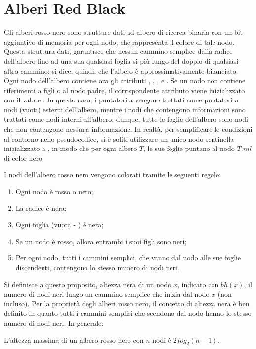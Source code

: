 \section{Alberi Red Black}
Gli alberi rosso nero sono strutture dati ad albero di ricerca binaria con un bit aggiuntivo di memoria per ogni nodo, che rappresenta il colore di tale nodo. Questa struttura dati, garantisce che nessun cammino semplice dalla radice dell'albero fino ad una sua qualsiasi foglia si più lungo del doppio di qualsiasi altro cammino: si dice, quindi, che l'albero è approssimativamente bilanciato. Ogni nodo dell'albero contiene ora gli attributi , , ,  e . Se un nodo non contiene riferimenti a figli o al nodo padre, il corrispondente attributo viene inizializzato con il valore . In questo caso, i puntatori a  vengono trattati come puntatori a nodi (vuoti) esterni dell'albero, mentre i nodi che contengono informazioni sono trattati come nodi interni all'albero: dunque, tutte le foglie dell'albero sono nodi che non contengono nessuna informazione. In realtà, per semplificare le condizioni al contorno nello pseudocodice, si è soliti utilizzare un unico nodo sentinella inizializzato a , in modo che per ogni albero \(T\), le sue foglie puntano al nodo \(T.nil\) di color nero.

I nodi dell'albero rosso nero vengono colorati tramite le seguenti regole:
\begin{enumerate}
  \item Ogni nodo è rosso o nero;
  \item La radice è nera;
  \item Ogni foglia (vuota - ) è nera;
  \item Se un nodo è rosso, allora entrambi i suoi figli sono neri;
  \item Per ogni nodo, tutti i cammini semplici, che vanno dal nodo alle sue foglie discendenti, contengono lo stesso numero di nodi neri.  
\end{enumerate}

Si definisce a questo proposito, altezza nera di un nodo \(x\), indicato con \(bh(x)\), il numero di nodi neri lungo un cammino semplice che inizia dal nodo \(x\) (non incluso). Per la proprietà degli alberi rosso nero, il concetto di altezza nera è ben definito in quanto tutti i cammini semplici che scendono dal nodo hanno lo stesso numero di nodi neri. In generale:

\begin{theorem}
  L'altezza massima di un albero rosso nero con \(n\) nodi è \(2\,log_2(n+1)\).
\end{theorem}


